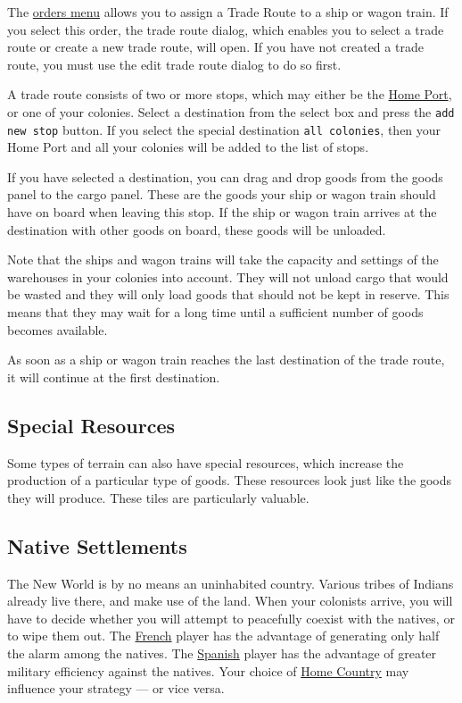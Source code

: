 \documentclass[12pt]{article}
\begin{document}
The \hyperlink{orders menu}{orders menu} allows you to assign a Trade
Route to a ship or wagon train. If you select this order, the trade
route dialog, which enables you to select a trade route or create a
new trade route, will open. If you have not created a trade route, you
must use the edit trade route dialog to do so first.

A trade route consists of two or more stops, which may either be the
\hyperlink{Home Port}{Home Port}, or one of your colonies. Select a
destination from the select box and press the \texttt{add new stop}
button. If you select the special destination \texttt{all colonies},
then your Home Port and all your colonies will be added to the list of
stops.

If you have selected a destination, you can drag and drop goods from
the goods panel to the cargo panel. These are the goods your ship or
wagon train should have on board when leaving this stop. If the ship
or wagon train arrives at the destination with other goods on board,
these goods will be unloaded.

Note that the ships and wagon trains will take the capacity and
settings of the warehouses in your colonies into account. They will
not unload cargo that would be wasted and they will only load goods
that should not be kept in reserve. This means that they may wait
for a long time until a sufficient number of goods becomes available.

As soon as a ship or wagon train reaches the last destination of the
trade route, it will continue at the first destination.


\hypertarget{Resources}{\subsection{Special Resources}}

Some types of terrain can also have special resources, which increase
the production of a particular type of goods. These resources look
just like the goods they will produce. These tiles are particularly
valuable.


\hypertarget{Native Settlements}{\subsection{Native Settlements}}

The New World is by no means an uninhabited country. Various tribes of
Indians already live there, and make use of the land. When your
colonists arrive, you will have to decide whether you will attempt to
peacefully coexist with the natives, or to wipe them out. The
\hyperlink{France}{French} player has the advantage of generating only
half the alarm among the natives. The \hyperlink{Spain}{Spanish}
player has the advantage of greater military efficiency against the
natives. Your choice of \hyperlink{Home Country}{Home Country} may
influence your strategy --- or vice versa.
\end{document}
